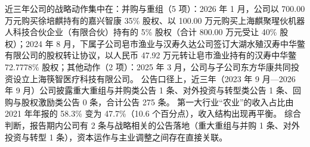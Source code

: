  近三年公司的战略动作集中在：并购与重组（5 项）：2026 年 1 月，公司以 700.00 万元购买徐培麒持有的嘉兴智康 35\% 股权、以 100.00 万元购买上海麒聚瑆伙机器人科技合伙企业（有限合伙）持有的 5\% 股权（合计 800.00 万元受让 40\% 股权）；2024 年 8 月，下属子公司皂市渔业与汉寿久达公司签订大湖水殖汉寿中华鳖有限公司的股权转让协议，以人民币 47.92 万元转让皂市渔业持有的汉寿中华鳖 72.7778\% 股权；其他动作（2 项）：2025 年 3 月，公司与子公司东方华康共同投资设立上海筷智医疗科技有限公司。 公告口径上，近三年（2023 年 9 月---2026 年 9 月）公司披露重大重组与并购类公告 1 条、对外投资与转型类公告 1 条、回购与股权激励类公告 0 条，合计公告 275 条。 第一大行业“农业”的收入占比由 2021 年年报的 58.3\% 变为 47.7\%（10.6 个百分点），收入结构出现再平衡。 综合判断，报告期内公司有 2 条与战略相关的公告落地（重大重组与并购 1 条、对外投资与转型 1 条），资本运作与主业调整之间存在直接关联。

